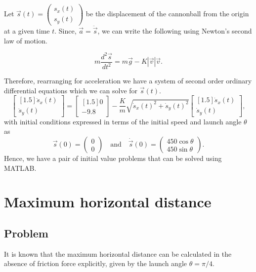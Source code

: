 \documentclass[11pt]{report}
\begin{document}
Let $\vec{s}(t)= \begin{pmatrix} s_x(t) \\ s_y(t) \end{pmatrix}$ be the displacement of the cannonball from the origin at a given time $t$. Since, $\vec{a}=\ddot{\vec{s}}$, we can write the following using Newton's second law of motion. 

\begin{equation}
	m\dfrac{d^2 \vec{s}}{dt^2} = m\vec{g} - K|\vec{v}|\vec{v} \label{eq:n2l}.
\end{equation}

Therefore, rearranging for acceleration we have a system of second order ordinary differential equations which we can solve for $\vec{s}(t)$.
\begin{equation}
	\begin{bmatrix}[1.5]
	\ddot{s}_x(t) \\ \ddot{s}_y(t)
	\end{bmatrix}
	=
	\begin{bmatrix}[1.5]
	0 \\ -9.8
	\end{bmatrix}
	- \dfrac{K}{m}\sqrt{\dot{s}_x(t)^2 + \dot{s}_y(t)^2}
	\begin{bmatrix}[1.5]
	\dot{s}_x(t) \\ \dot{s}_y(t)
	\end{bmatrix},
	\label{eq:ode}
\end{equation}
with initial conditions expressed in terms of the initial speed and launch angle $\theta$ as
\begin{equation}
	\vec{s}(0) = \begin{pmatrix} 0 \\ 0 \end{pmatrix} \quad\text{and}\quad \dot{\vec{s}}(0) = \begin{pmatrix} 450\cos{\theta} \\ 450\sin{\theta} \end{pmatrix}.
	\label{eq:ic}
\end{equation}
Hence, we have a pair of initial value problems that can be solved using MATLAB.

\chapter{Maximum horizontal distance}
\section*{Problem}
It is known that the maximum horizontal distance can be calculated in the absence of friction force explicitly, given by the launch angle $\theta=\pi/4$.\\
\end{document}
